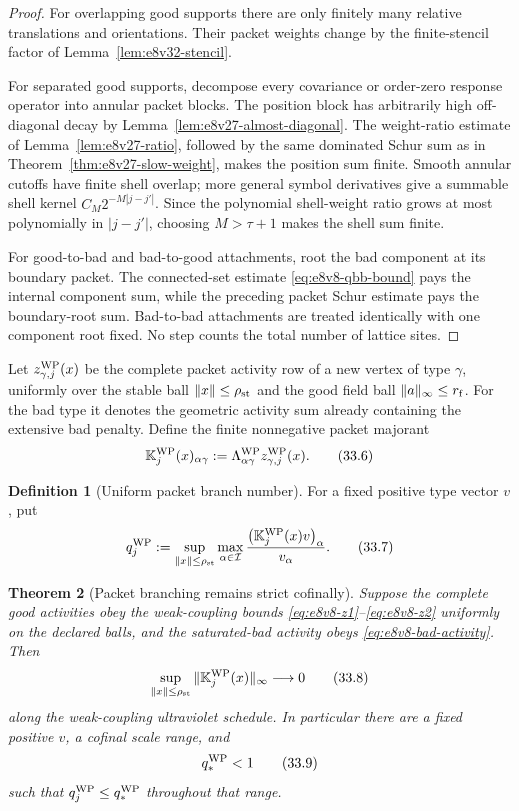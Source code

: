 \documentclass[11pt,oneside]{book}
\newtheorem{theorem}{Theorem}[chapter]
\theoremstyle{definition}
\newtheorem{definition}[theorem]{Definition}
\theoremstyle{remark}
\begin{document}
\begin{proof}
For overlapping good supports there are only finitely many relative
translations and orientations.  Their packet weights change by the
finite-stencil factor of Lemma~\ref{lem:e8v32-stencil}.

For separated good supports, decompose every covariance or
order-zero response operator into annular packet blocks.  The
position block has arbitrarily high off-diagonal decay by
Lemma~\ref{lem:e8v27-almost-diagonal}.  The weight-ratio estimate
of Lemma~\ref{lem:e8v27-ratio}, followed by the same dominated Schur
sum as in Theorem~\ref{thm:e8v27-slow-weight}, makes the position
sum finite.  Smooth annular cutoffs have finite shell overlap; more
general symbol derivatives give a summable shell kernel
\(C_M2^{-M|j-j'|}\).  Since the polynomial shell-weight ratio grows
at most polynomially in \(|j-j'|\), choosing \(M>\tau+1\) makes the
shell sum finite.

For good-to-bad and bad-to-good attachments, root the bad component
at its boundary packet.  The connected-set estimate
\eqref{eq:e8v8-qbb-bound} pays the internal component sum, while
the preceding packet Schur estimate pays the boundary-root sum.
Bad-to-bad attachments are treated identically with one component
root fixed.  No step counts the total number of lattice sites.
\end{proof}

Let \(z_{\gamma,j}^{\rm WP}(x)\) be the complete packet activity row
of a new vertex of type \(\gamma\), uniformly over the stable ball
\(\|x\|\leq\rho_{\rm st}\) and the good field ball
\(\|a\|_\infty\leq r_{\rm f}\).  For the bad type it denotes the
geometric activity sum already containing the extensive bad penalty.
Define the finite nonnegative packet majorant
\[
 {\mathbb K}^{\rm WP}_j(x)_{\alpha\gamma}
 :=
 \Lambda_{\alpha\gamma}^{\rm WP}
 z_{\gamma,j}^{\rm WP}(x).                                     \tag{33.6}
\]

\begin{definition}[Uniform packet branch number]
\label{def:e8v33-qwp}
For a fixed positive type vector \(v\), put
\[
 q_j^{\rm WP}:=
 \sup_{\|x\|\leq\rho_{\rm st}}
 \max_{\alpha\in{\cal I}}
 \frac{\bigl({\mathbb K}^{\rm WP}_j(x)v\bigr)_\alpha}{v_\alpha}.
                                                                    \tag{33.7}
\]
\end{definition}

\begin{theorem}[Packet branching remains strict cofinally]
\label{thm:e8v33-qwp}
Suppose the complete good activities obey the weak-coupling bounds
\eqref{eq:e8v8-z1}--\eqref{eq:e8v8-z2} uniformly on the declared
balls, and the saturated-bad activity obeys
\eqref{eq:e8v8-bad-activity}.  Then
\[
 \sup_{\|x\|\leq\rho_{\rm st}}
 \|{\mathbb K}^{\rm WP}_j(x)\|_\infty
 \longrightarrow0                                               \tag{33.8}
\]
along the weak-coupling ultraviolet schedule.  In particular there
are a fixed positive \(v\), a cofinal scale range, and
\[
                              q_*^{\rm WP}<1                     \tag{33.9}
\]
such that \(q_j^{\rm WP}\leq q_*^{\rm WP}\) throughout that range.
\end{theorem}
\end{document}
